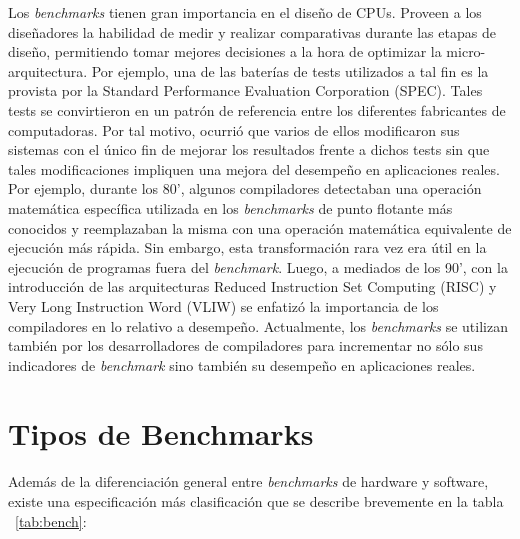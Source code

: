 Los \textit{benchmarks} tienen gran importancia en el diseño de
CPUs. Proveen a los diseñadores la habilidad de medir y realizar
comparativas durante las etapas de diseño, permitiendo tomar mejores
decisiones a la hora de optimizar la micro-arquitectura. Por ejemplo,
una de las baterías de tests utilizados a tal fin es la provista por
la Standard Performance Evaluation Corporation (SPEC). Tales tests se
convirtieron en un patrón de referencia entre los diferentes
fabricantes de computadoras. Por tal motivo, ocurrió que varios de
ellos modificaron sus sistemas con el único fin de mejorar los
resultados frente a dichos tests sin que tales modificaciones
impliquen una mejora del desempeño en aplicaciones reales. Por
ejemplo, durante los 80', algunos compiladores detectaban una
operación matemática específica utilizada en los \textit{benchmarks}
de punto flotante más conocidos y reemplazaban la misma con una
operación matemática equivalente de ejecución más rápida. Sin embargo,
esta transformación rara vez era útil en la ejecución de programas
fuera del \textit{benchmark}. Luego, a mediados de los 90', con la
introducción de las arquitecturas Reduced Instruction Set Computing
(RISC) y Very Long Instruction Word (VLIW) se enfatizó la importancia
de los compiladores en lo relativo a desempeño. Actualmente, los
\textit{benchmarks} se utilizan también por los desarrolladores de
compiladores para incrementar no sólo sus indicadores de
\textit{benchmark} sino también su desempeño en aplicaciones
reales. 

\section{Tipos de Benchmarks}

Además de la diferenciación general entre \textit{benchmarks} de
hardware y software, existe una especificación más clasificación que se
describe brevemente en la tabla ~\ref{tab:bench}:

